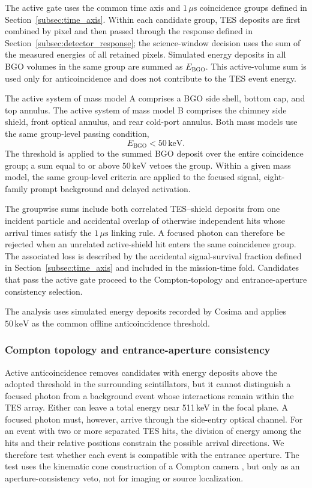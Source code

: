 \documentclass[11pt]{article}
\newcommand{\revblue}[1]{\textcolor{revisionblue}{#1}}
\newcommand{\keV}{\ensuremath{\,\mathrm{keV}}}
\begin{document}
The active gate uses the common time axis and $1\,\mu\mathrm{s}$ coincidence
groups defined in Section~\ref{subsec:time_axis}. Within each candidate group,
TES deposits are first combined by pixel and then passed through the response
defined in Section~\ref{subsec:detector_response}; the science-window decision
uses the sum of the measured energies of all retained pixels. Simulated energy
deposits in all BGO volumes in the same group are summed as
$E_{\mathrm{BGO}}$. This active-volume sum is used only for anticoincidence and
does not contribute to the TES event energy.

The active system of mass model A comprises a BGO side shell, bottom cap, and
top annulus. The active system of mass model B comprises the chimney side
shield, front optical annulus, and rear cold-port annulus. Both mass models use
the same group-level passing condition,
\[
 E_{\mathrm{BGO}}<50\keV .
\]
The threshold is applied to the summed BGO deposit over the entire coincidence
group; a sum equal to or above $50\keV$ vetoes the group.
Within a given mass model, the same group-level criteria are applied to the
focused signal, \revblue{eight-family prompt background and delayed
activation}.

The groupwise sums include both correlated TES--shield deposits from one
incident particle and accidental overlap of otherwise independent hits whose
arrival times satisfy the $1\,\mu\mathrm{s}$ linking rule. A focused photon can
therefore be rejected when an unrelated active-shield hit enters the same
coincidence group. The associated loss is described by the accidental
signal-survival fraction defined in Section~\ref{subsec:time_axis} and included
in the mission-time fold. Candidates that pass the active gate proceed to the
Compton-topology and entrance-aperture consistency selection.

The analysis uses simulated energy deposits recorded by Cosima and applies
$50\keV$ as the common offline anticoincidence threshold.

\subsubsection{Compton topology and entrance-aperture consistency}

Active anticoincidence removes candidates with energy deposits above the adopted
threshold in the surrounding scintillators, but it cannot distinguish a focused photon from a
background event whose interactions remain within the TES array. Either can
leave a total energy near 511\,keV in the focal plane. A focused photon must,
however, arrive through the side-entry optical channel. For an event with two
or more separated TES hits, the division of energy among the hits and their
relative positions constrain the possible arrival directions. We therefore test
whether each event is compatible with the entrance aperture. The test uses the
kinematic cone construction of a Compton camera
\cite{Zoglauer2006}, but only as an aperture-consistency veto, not for imaging
or source localization.
\end{document}
